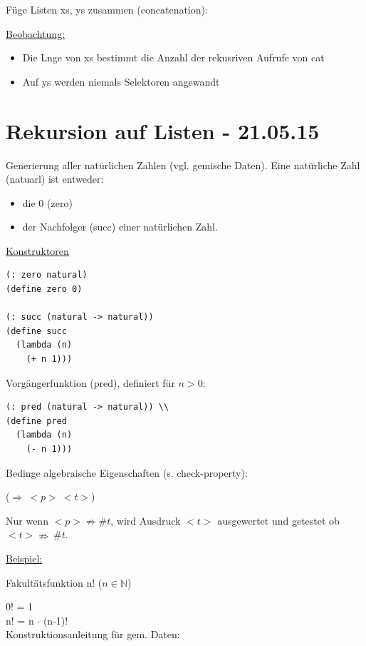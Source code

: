 \documentclass[a4paper, 20pt, openany]{book}
\begin{document}
Füge Listen xs, ys zusammen (concatenation):


\underline{Beobachtung:}

\begin{itemize}
  \item Die Lnge von xs bestimmt die Anzahl der rekusriven Aufrufe von cat
  \item Auf ys werden niemals Selektoren angewandt
\end{itemize}

\chapter{Rekursion auf Listen - 21.05.15}

Generierung aller natürlichen Zahlen (vgl. gemische Daten). Eine natürliche Zahl (natuarl) ist entweder:

\begin{itemize}
  \item die 0 (zero)
  \item der Nachfolger (succ) einer natürlichen Zahl.
\end{itemize}

\underline{Konstruktoren}

\begin{lstlisting}
(: zero natural)
(define zero 0)

(: succ (natural -> natural))
(define succ 
  (lambda (n) 
    (+ n 1))) 
\end{lstlisting}

Vorgängerfunktion (pred), definiert für $n>0$:

\begin{lstlisting}
(: pred (natural -> natural)) \\
(define pred 
  (lambda (n) 
    (- n 1))) 
\end{lstlisting}

Bedinge algebraische Eigenschaften (s. check-property):

($\Rightarrow \ <p> \ <t>$)

Nur wenn $<p> \nRightarrow \#t$, wird Ausdruck $<t>$ ausgewertet und getestet ob $<t> \nRightarrow \ \#t$.

\underline{Beispiel:}

Fakultätsfunktion n! ($n \in \mathbb{N}$)

0! = 1 \\
n! = n $\cdot$ (n-1)! \\

Konstruktionsanleitung für gem. Daten:
\end{document}

